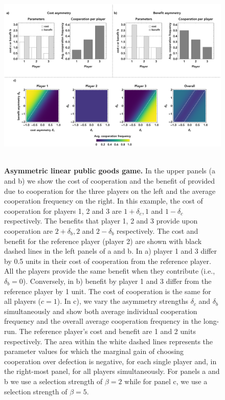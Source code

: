 \documentclass[11pt]{article}
\theoremstyle{plainCl1}
\theoremstyle{plainCl2}
\begin{document}
\clearpage
\begin{figure}
\centering
\includegraphics[width =  \textwidth]{figures/figure2.eps}~\\[0.4cm]
\caption{\onehalfspacing
\textbf{Asymmetric linear public goods game.} In the upper panels (a and b) we show the cost of cooperation and the benefit of provided due to cooperation for the three players on the left and the average cooperation frequency on the right. In this example, the cost of cooperation for players 1, 2 and 3 are $1 + \delta_c, 1$ and $1 - \delta_c$ respectively. The benefits that player 1, 2 and 3 provide upon cooperation are $2 + \delta_b, 2$ and $2 - \delta_b$ respectively. The cost and benefit for the reference player (player 2) are shown with black dashed lines in the left panels of a and b. In a) player 1 and 3 differ by 0.5 units in their cost of cooperation from the reference player. All the players provide the same benefit when they contribute (i.e., $\delta_b = 0$). Conversely, in b) benefit by player 1 and 3 differ from the reference player by 1 unit. The cost of cooperation is the same for all players ($c = 1$). In c), we vary the asymmetry strengths $\delta_c $ and $\delta_b$ simultaneously and show both average individual cooperation frequency and the overall average cooperation frequency in the long-run. The reference player's cost and benefit are 1 and 2 units respectively. The area within the white dashed lines represents the parameter values for which the marginal gain of choosing cooperation over defection is negative, for each single player and, in the right-most panel, for all players simultaneously. For panels a and b we use a selection strength of $\beta = 2$ while for panel c, we use a selection strength of $\beta = 5$. 
}
\label{Fig:LPGG-asymmetric}
\end{figure}
\end{document}
